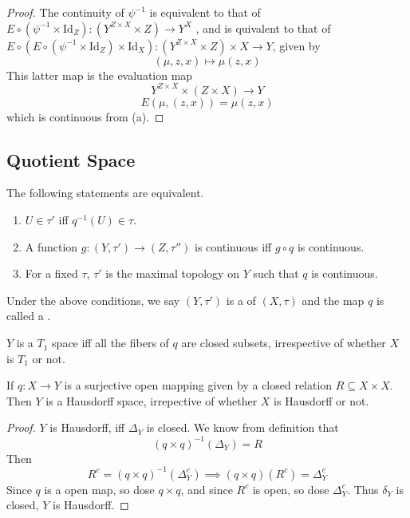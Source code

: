 \documentclass[../main.tex]{subfiles}
\begin{document}
\begin{proof}
    The continuity of \(  \psi   ^{-1} \) is equivalent to that of  \(  E\circ \left( \psi ^{-1} \times \mathrm{Id}_{Z} \right)   : \left( Y^{Z\times X}\times Z \right)\to Y^{X} \) , and is quivalent to that of \(  E\circ \left( E\circ \left( \psi ^{-1} \times \mathrm{Id}_{Z} \right)\times \mathrm{Id}_{X}  \right):\left( Y^{Z\times X}\times Z \right)\times X\to Y    \), given by \[
    \left( \mu ,z,x \right)\mapsto \mu \left( z,x \right)  
    \] This latter map is the evaluation map\[
   Y^{Z\times X}\times \left( Z\times X \right)\to Y  
    \] \[
    E\left( \mu ,\left( z,x \right)  \right)= \mu \left( z,x \right)  
    \] which is continuous from (a).
\end{proof}

\subsection{Quotient Space}
\begin{lemma}{}{}
The following statements are equivalent.
\begin{enumerate}
    \item[(i)] $U \in \tau'$ iff $q^{-1}(U) \in \tau$.
    \item[(ii)] A function $g : (Y, \tau') \to (Z, \tau'')$ is continuous iff $g \circ q$ is continuous.
    \item[(iii)] For a fixed $\tau$, $\tau'$ is the maximal topology on $Y$ such that $q$ is continuous.
\end{enumerate}
\end{lemma}

\begin{definition}{}{}
Under the above conditions, we say $(Y, \tau')$ is a  of $(X, \tau)$ and the map $q$ is called a .
\end{definition}

\begin{proposition}{}{}
    \(  Y  \) is a \(  T_1  \) space iff all the fibers of \(  q  \) are closed subsets, irrespective of whether \(  X  \) is \(  T_1  \) or not.     
\end{proposition}
\begin{proposition}{}{}
    If \(  q:X\to Y  \) is a surjective open mapping given by a closed relation \(  R\subseteq X\times X  \). Then \(  Y  \) is a Hausdorff space, irrepective of whether \(  X  \) is Hausdorff or not.    
\end{proposition}
\begin{proof}
    \(  Y  \) is Hausdorff, iff \(   \Delta _{Y}  \) is closed. We know from definition that  \[
    \left( q \times q \right)^{-1} \left(  \Delta _{Y} \right)= R  
    \]  Then \[
    R^{c}= \left( q \times  q \right)^{-1} \left(   \Delta _{Y}^{c} \right)\implies \left( q\times q \right)\left( R^{c} \right)=  \Delta _{Y}^{c}     
    \]Since \(  q  \) is a open map, so dose \(  q\times q  \), and since \(  R^{c}  \) is open, so dose \(   \Delta _{Y}^{c}  \).    Thus \(   \delta _{Y}  \) is closed,  \(  Y  \) is Hausdorff.  
\end{proof}
\end{document}
